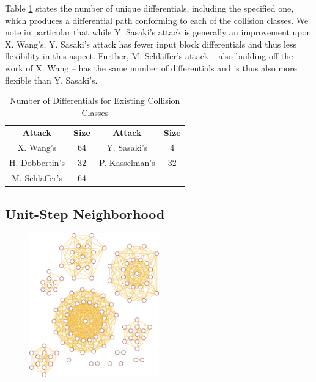 \documentclass[conference]{IEEEtran}
\begin{document}
Table \ref{table:differentials} states the number of unique differentials,
including the specified one, which produces a differential path conforming to
each of the collision classes. We note in particular that while Y. Sasaki's
attack is generally an improvement upon X. Wang's, Y. Sasaki's attack has fewer
input block differentials and thus less flexibility in this aspect. Further,
M. Schl{\"a}ffer's attack -- also building off the work of X. Wang -- has the
same number of differentials and is thus also more flexible than Y. Sasaki's.

\begin{table}
    \caption{Number of Differentials for Existing Collision Classes}
    \label{table:differentials}
    \begin{tabular}{c c c c}
        \textbf{Attack} & \textbf{Size} & \textbf{Attack} & \textbf{Size} \\
        X. Wang's & 64 & Y. Sasaki's & 4 \\
        H. Dobbertin's & 32 & P. Kasselman's & 32 \\
        M. Schl{\"a}ffer's & 64 & & \\
    \end{tabular}
\end{table}

\subsection{Unit-Step Neighborhood} \label{empirical:neighborhood}

\begin{figure}
\begin{center}
\includegraphics[width=0.5\textwidth]{Figs/graph-neighborhood-crop.pdf}
\caption{}
\label{Fig:Graph-Neighborhood}
\end{center}
\end{figure}
\end{document}
